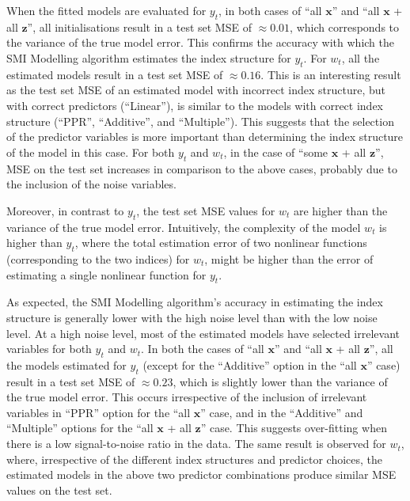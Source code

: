\documentclass[
  11pt,
  a4paper,
]{article}
\begin{document}
When the fitted models are evaluated for \(y_{t}\), in both cases of
``all \(\bm{x}\)'' and ``all \(\bm{x}\) + all \(\bm{z}\)'', all
initialisations result in a test set MSE of \(\approx 0.01\), which
corresponds to the variance of the true model error. This confirms the
accuracy with which the SMI Modelling algorithm estimates the index
structure for \(y_{t}\). For \(w_{t}\), all the estimated models result
in a test set MSE of \(\approx 0.16\). This is an interesting result as
the test set MSE of an estimated model with incorrect index structure,
but with correct predictors (``Linear''), is similar to the models with
correct index structure (``PPR'', ``Additive'', and ``Multiple''). This
suggests that the selection of the predictor variables is more important
than determining the index structure of the model in this case. For both
\(y_{t}\) and \(w_{t}\), in the case of ``some \(\bm{x}\) + all
\(\bm{z}\)'', MSE on the test set increases in comparison to the above
cases, probably due to the inclusion of the noise variables.

Moreover, in contrast to \(y_{t}\), the test set MSE values for
\(w_{t}\) are higher than the variance of the true model error.
Intuitively, the complexity of the model \(w_{t}\) is higher than
\(y_{t}\), where the total estimation error of two nonlinear functions
(corresponding to the two indices) for \(w_{t}\), might be higher than
the error of estimating a single nonlinear function for \(y_{t}\).

As expected, the SMI Modelling algorithm's accuracy in estimating the
index structure is generally lower with the high noise level than with
the low noise level. At a high noise level, most of the estimated models
have selected irrelevant variables for both \(y_{t}\) and \(w_{t}\). In
both the cases of ``all \(\bm{x}\)'' and ``all \(\bm{x}\) + all
\(\bm{z}\)'', all the models estimated for \(y_{t}\) (except for the
``Additive'' option in the ``all \(\bm{x}\)'' case) result in a test set
MSE of \(\approx 0.23\), which is slightly lower than the variance of
the true model error. This occurs irrespective of the inclusion of
irrelevant variables in ``PPR'' option for the ``all \(\bm{x}\)'' case,
and in the ``Additive'' and ``Multiple'' options for the ``all
\(\bm{x}\) + all \(\bm{z}\)'' case. This suggests over-fitting when
there is a low signal-to-noise ratio in the data. The same result is
observed for \(w_{t}\), where, irrespective of the different index
structures and predictor choices, the estimated models in the above two
predictor combinations produce similar MSE values on the test set.
\end{document}
